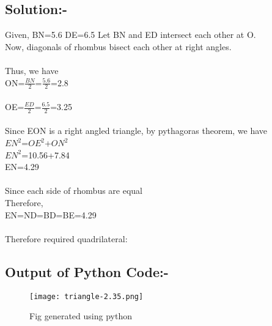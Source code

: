 \documentclass[a4paper,12pt]{article}
\begin{document}
\subsection{Solution:-}
Given, BN=5.6 DE=6.5
Let BN and ED intersect each other at O.\\
Now, diagonals of rhombus bisect each other at right angles.\\\\
Thus, we have\\
ON=$\frac{BN}{2}$=$\frac{5.6}{2}$=2.8\\\\
OE=$\frac{ED}{2}$=$\frac{6.5}{2}$=3.25\\\\
Since EON is a right angled triangle, by pythagoras theorem, we have\\
$EN^2$=$OE^2$+$ON^2$\\
$EN^2$=10.56+7.84\\
EN=4.29\\\\
Since each side of rhombus are equal\\
Therefore, \\
EN=ND=BD=BE=4.29\\\\
	Therefore required quadrilateral:
\begin{center}
\end{center}
\subsection{Output of Python Code:-}
\begin{figure}[htp]
	\centering
	\texttt{[image: triangle-2.35.png]}
	\caption{Fig generated using python}
\end{figure}
\end{document}
